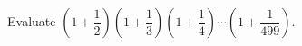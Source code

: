 Evaluate $\left(1+\dfrac{1}{2}\right)\left(1+\dfrac{1}{3}\right)\left(1+\dfrac{1}{4}\right)\cdots\left(1+\dfrac{1}{499}\right)$.
